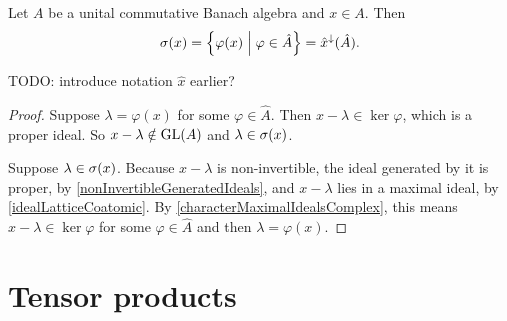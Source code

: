 \begin{proposition} \label{spectrumFromSpectrum}
Let $A$ be a unital commutative Banach algebra and $x\in A$. Then
\[ \spec(x) = \setbuilder{\varphi(x)}{\varphi\in\hat{A}} = \hat{x}^{\imf}(\hat{A}). \]
\end{proposition}
TODO: introduce notation $\hat{x}$ earlier?
\begin{proof}
Suppose $\lambda = \varphi(x)$ for some $\varphi\in\hat{A}$. Then $x-\lambda\in\ker\varphi$, which is a proper ideal.
So $x-\lambda \notin\operatorname{GL}(A)$ and $\lambda \in\sigma(x)$.

Suppose $\lambda \in \sigma(x)$. Because $x-\lambda$ is non-invertible, the ideal generated by it is proper, by \ref{nonInvertibleGeneratedIdeals}, and $x-\lambda$ lies in a maximal ideal, by \ref{idealLatticeCoatomic}. By \ref{characterMaximalIdealsComplex}, this means $x-\lambda \in \ker\varphi$ for some $\varphi\in\hat{A}$ and then $\lambda = \varphi(x)$.
\end{proof}

\section{Tensor products}
